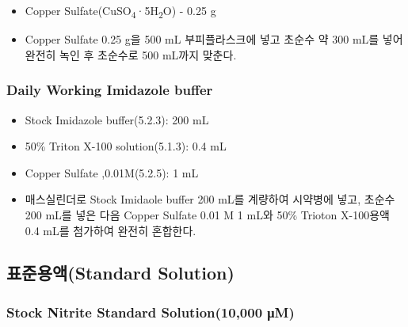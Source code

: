 \documentclass[
]{book}
\providecommand{\tightlist}{%
  \setlength{\itemsep}{0pt}\setlength{\parskip}{0pt}}
\begin{document}
\begin{itemize}
\tightlist
\item
  Copper Sulfate(CuSO\textsubscript{4}·5H\textsubscript{2}O) - 0.25 g\\
\item
  Copper Sulfate 0.25 g을 500 mL 부피플라스크에 넣고 초순수 약 300 mL를 넣어 완전히 녹인 후 초순수로 500 mL까지 맞춘다.
\end{itemize}

\hypertarget{daily-working-imidazole-buffer}{%
\subsubsection{Daily Working Imidazole buffer}\label{daily-working-imidazole-buffer}}

\begin{itemize}
\tightlist
\item
  Stock Imidazole buffer(5.2.3): 200 mL
\item
  50\% Triton X-100 solution(5.1.3): 0.4 mL
\item
  Copper Sulfate ,0.01M(5.2.5): 1 mL
\item
  매스실린더로 Stock Imidaole buffer 200 mL를 계량하여 시약병에 넣고, 초순수 200 mL를 넣은 다음 Copper Sulfate 0.01 M 1 mL와 50\% Trioton X-100용액 0.4 mL를 첨가하여 완전히 혼합한다.
\end{itemize}

\hypertarget{uxd45cuxc900uxc6a9uxc561standard-solution}{%
\subsection{표준용액(Standard Solution)}\label{uxd45cuxc900uxc6a9uxc561standard-solution}}

\hypertarget{stock-nitrite-standard-solution10000-ux3bcm}{%
\subsubsection{Stock Nitrite Standard Solution(10,000 μM)}\label{stock-nitrite-standard-solution10000-ux3bcm}}
\end{document}
